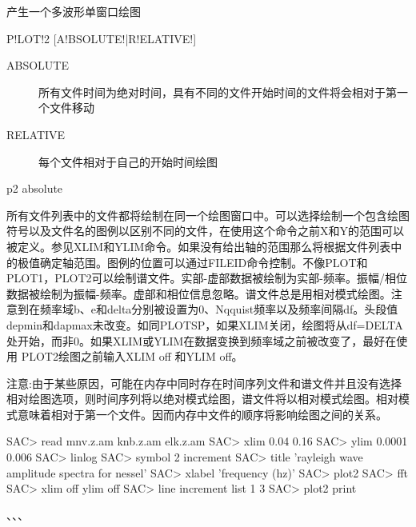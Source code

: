 \label{cmd:plot2}

产生一个多波形单窗口绘图

\begin{SACSTX}
P!LOT!2 [A!BSOLUTE!|R!ELATIVE!]
\end{SACSTX}

\begin{description}
\item [ABSOLUTE] 所有文件时间为绝对时间，具有不同的文件开始时间的文件将会相对于第一个文件移动
\item [RELATIVE] 每个文件相对于自己的开始时间绘图
\end{description}

\begin{SACDFT}
p2 absolute
\end{SACDFT}

所有文件列表中的文件都将绘制在同一个绘图窗口中。可以选择绘制一个包含绘图符号以及文件名的图例以区别不同的文件，在使用这个命令之前X和Y的范围可以被定义。参见XLIM和YLIM命令。如果没有给出轴的范围那么将根据文件列表中的极值确定轴范围。图例的位置可以通过FILEID命令控制。不像PLOT和PLOT1，PLOT2可以绘制谱文件。实部-虚部数据被绘制为实部-频率。振幅/相位数据被绘制为振幅-频率。虚部和相位信息忽略。谱文件总是用相对模式绘图。注意到在频率域b、e和delta分别被设置为0、Nqquist频率以及频率间隔df。头段值depmin和dapmax未改变。如同PLOTSP，如果XLIM关闭，绘图将从df=DELTA处开始，而非0。如果XLIM或YLIM在数据变换到频率域之前被改变了，最好在使用	PLOT2绘图之前输入XLIM off 和YLIM off。

注意:由于某些原因，可能在内存中同时存在时间序列文件和谱文件并且没有选择相对绘图选项，则时间序列将以绝对模式绘图，谱文件将以相对模式绘图。相对模式意味着相对于第一个文件。因而内存中文件的顺序将影响绘图之间的关系。

\begin{SACCode}
SAC> read mnv.z.am knb.z.am elk.z.am
SAC> xlim 0.04 0.16
SAC> ylim 0.0001 0.006
SAC> linlog
SAC> symbol 2 increment
SAC> title 'rayleigh wave amplitude spectra for nessel'
SAC> xlabel 'frequency (hz)'
SAC> plot2
SAC> fft
SAC> xlim off ylim off
SAC> line increment list 1 3
SAC> plot2 print
\end{SACCode}

、、、
